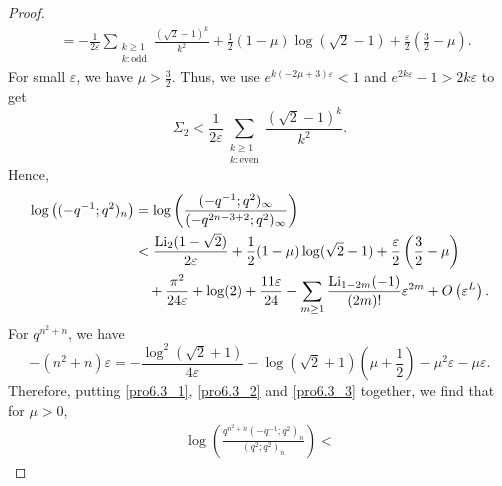\documentclass[11pt,reqno]{amsart}
\theoremstyle{remark}
\numberwithin{equation}{section}
\def\Li{\operatorname{Li}}
\def\Li{\operatorname{Li}}
\begin{document}
\begin{proof}
\begin{align*}
	 &= - \frac1{2\varepsilon} \sum_{\substack{k \geq 1\\k: \text{odd}}} \frac{(\sqrt{2}-1)^k}{k^2} + \frac{1}{2}(1-\mu) \log(\sqrt{2}-1) + \frac{\varepsilon}{2} \left( \frac32-\mu \right).
\end{align*}
For small $\varepsilon$, we have $\mu >\frac{3}{2}$. Thus, we use $e^{k(-2\mu+3) \varepsilon} < 1$ and $e^{2k\varepsilon}-1>2k\varepsilon$ to get
\[
	\Sigma_2 < \frac1{2\varepsilon}\sum_{\substack{k \geq 1\\k: \text{even}}} \frac{(\sqrt{2}-1)^k}{k^2}.
\]
Hence,
\begin{align}
	\log\big( (-q^{-1};q^2)_n\big)& =\log \left(\frac{(-q^{-1};q^2)_\infty}{(-q^{2n-3+2};q^2)_\infty} \right) \notag \\
    &< \frac{\Li_2(1-\sqrt{2})}{2\varepsilon} + \frac{1}{2}(1-\mu) \log(\sqrt{2}-1) + \frac{\varepsilon}{2} \left( \frac32-\mu \right) \notag\\
	 &\quad + \frac{\pi^{2}}{24\varepsilon} + \log(2) + \frac{11\varepsilon}{24} -\sum_{m \geq 1} \frac{\Li_{1-2m}(-1)}{(2m)!} \varepsilon^{2m}+ O\left(\varepsilon^L\right). \label{pro6.3_2}
\end{align}
For $q^{n^2+n}$, we have
\begin{equation}
	-(n^2+n) \varepsilon = - \frac{\log^2 (\sqrt{2}+1)}{4\varepsilon}  - \log (\sqrt{2}+1) \left( \mu+\frac12\right)  - \mu^2 \varepsilon   - \mu \varepsilon. \label{pro6.3_3}
\end{equation}
Therefore, putting \eqref{pro6.3_1}, \eqref{pro6.3_2} and \eqref{pro6.3_3} together, we find that for $\mu>0$,
\begin{multline*}
	\log\left(\frac{q^{n^2+n} (-q^{-1};q^2)_n}{(q^2;q^2)_n} \right) <%

\end{multline*}
\end{proof}
\end{document}
